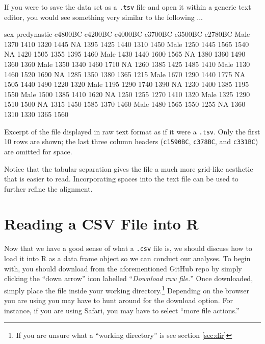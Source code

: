 If you were to save the  data set as a \texttt{.tsv} file and open it within a generic text editor, you would see something very similar to the following ...

\vspace{1em}

\begin{listing}[H]
\begin{raw}
sex	predynastic	c4800BC	c4200BC	c4000BC	c3700BC	c3500BC	c2780BC
Male	1370	1410	1320	1445	NA	1395	1425	1440	1310	1450
Male	1250	1445	1565	1540	NA	1420	1505	1355	1395	1460
Male	1430	1440	1600	1565	NA	1380	1360	1490	1360	1360
Male	1350	1340	1460	1710	NA	1260	1385	1425	1485	1410
Male	1130	1460	1520	1690	NA	1285	1350	1380	1365	1215
Male	1670	1290	1440	1775	NA	1505	1440	1490	1220	1320
Male	1195	1290	1740	1390	NA	1230	1400	1385	1195	1550
Male	1500	1385	1410	1620	NA	1250	1255	1270	1410	1320
Male	1325	1290	1510	1500	NA	1315	1450	1585	1370	1460
Male	1480	1565	1550	1255	NA	1360	1310	1330	1365	1560
\end{raw}
\caption*{Excerpt of the  file displayed in raw text format as if it were a \texttt{.tsv}. Only the first 10 rows are shown; the last three column headers (\texttt{c1590BC}, \texttt{c378BC}, and \texttt{c331BC}) are omitted for space.}
\end{listing}

\noindent Notice that the tabular separation gives the file a much more grid-like aesthetic that is easier to read. Incorporating spaces into the text file can be used to further refine the alignment.

\section{Reading a CSV File into R}

Now that we have a good sense of what a \texttt{.csv} file is, we should discuss how to load it into R as a data frame object so we can conduct our analyses. To begin with, you should download  from the aforementioned GitHub repo by simply clicking the ``down arrow'' icon labelled ``\textit{Download raw file.}'' Once downloaded, simply place the file inside your working directory.\footnote{If you are unsure what a ``working directory'' is see section \ref{sec:dir}} Depending on the browser you are using you may have to hunt around for the download option. For instance, if you are using Safari, you may have to select ``more file actions.''

